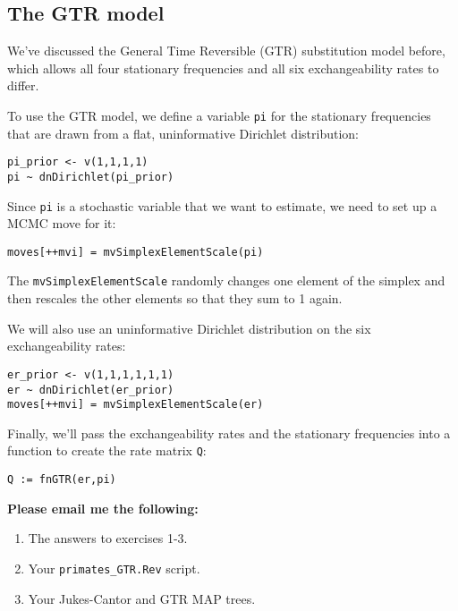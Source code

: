 \documentclass[11pt]{article}
\begin{document}
\subsection{The GTR model}

We've discussed the General Time Reversible (GTR)
substitution model before, which allows 
all four stationary frequencies and all six exchangeability rates to differ.

To use the GTR model, we define a variable \texttt{pi} for the stationary
frequencies that are drawn from a flat, uninformative Dirichlet distribution:
\begin{verbatim}
pi_prior <- v(1,1,1,1)
pi ~ dnDirichlet(pi_prior)
\end{verbatim}
Since \texttt{pi} is a stochastic variable that we want to estimate,
we need to set up a MCMC move for it:
\begin{verbatim}
moves[++mvi] = mvSimplexElementScale(pi)
\end{verbatim}
The \texttt{mvSimplexElementScale} randomly changes one element of the simplex
and then rescales the other elements so that they sum to 1 again.

We will also use an uninformative Dirichlet distribution on the 
six exchangeability rates:
\begin{verbatim}
er_prior <- v(1,1,1,1,1,1)
er ~ dnDirichlet(er_prior)
moves[++mvi] = mvSimplexElementScale(er)
\end{verbatim}
Finally, we'll pass the exchangeability rates and the stationary frequencies
into a function to create the rate matrix \texttt{Q}:
\begin{verbatim}
Q := fnGTR(er,pi)
\end{verbatim}

\begin{framed}
\noindent
\textbf{Please email me the following:}
\begin{enumerate}
  \item The answers to exercises 1-3.
  \item Your \texttt{primates\_GTR.Rev} script.
  \item Your Jukes-Cantor and GTR MAP trees.
\end{enumerate}
\end{framed}


 
\end{document}
